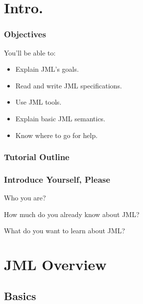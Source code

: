 \section*{Intro.}

\begin{frame}
\frametitle{Objectives}

You'll be able to:
  \begin{itemize}
  \item
    Explain JML's goals.
  \item
    Read and write JML specifications.
  \item
    Use JML tools.
  \item
    Explain basic JML semantics.
  \item
    Know where to go for help.
  \end{itemize}
\end{frame}

\begin{frame}
\frametitle{Tutorial Outline}
  \tableofcontents[hideallsubsections] %
\end{frame}

\begin{frame}
\frametitle{Introduce Yourself, Please}

\begin{question}
Who you are?
\end{question}

\begin{question}
How much do you already know about JML?
\end{question}

\begin{question}
What do you want to learn about JML?
\end{question}
\end{frame}


\section[Overview]{JML Overview}

\subsection[Basics]{Basics}

